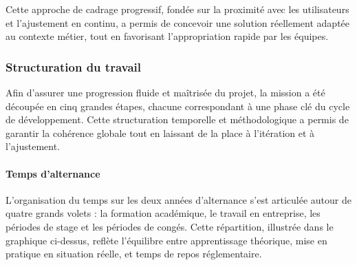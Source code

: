 \documentclass[11pt,a4paper]{article}
\begin{document}
\noindent Cette approche de cadrage progressif, fondée sur la proximité avec les utilisateurs et l’ajustement en continu, a permis de concevoir une solution réellement adaptée au contexte métier, tout en favorisant l’appropriation rapide par les équipes.

\subsubsection{Structuration du travail}

Afin d’assurer une progression fluide et maîtrisée du projet, la mission a été découpée en cinq grandes étapes, chacune correspondant à une phase clé du cycle de développement. Cette structuration temporelle et méthodologique a permis de garantir la cohérence globale tout en laissant de la place à l’itération et à l’ajustement.


\paragraph{Temps d'alternance} 

L’organisation du temps sur les deux années d’alternance s’est articulée autour de quatre grands volets : la formation académique, le travail en entreprise, les périodes de stage et les périodes de congés. Cette répartition, illustrée dans le graphique ci-dessus, reflète l’équilibre entre apprentissage théorique, mise en pratique en situation réelle, et temps de repos réglementaire.
\end{document}
